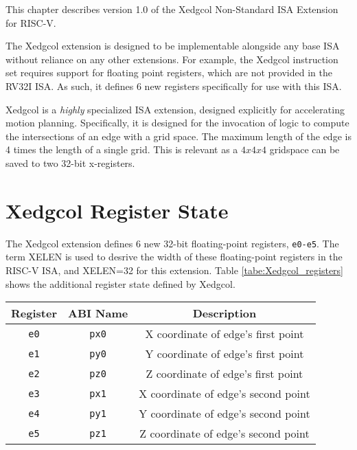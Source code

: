 
This chapter describes version 1.0 of the Xedgcol Non-Standard ISA Extension for RISC-V.

The Xedgcol extension is designed to be implementable alongside any base ISA without reliance on any other extensions. For example, the Xedgcol instruction set requires support for floating point registers, which are not provided in the RV32I ISA. As such, it defines 6 new registers specifically for use with this ISA.

Xedgcol is a \textit{highly} specialized ISA extension, designed explicitly for accelerating motion planning.
Specifically, it is designed for the invocation of logic to compute the intersections of an edge with a grid space. The maximum length of the edge is 4 times the length of a single grid. This is relevant as a $4x4x4$ gridspace can be saved to two 32-bit x-registers.

\section{Xedgcol Register State}
The Xedgcol extension defines 6 new 32-bit floating-point registers, \texttt{e0-e5}. The term XELEN is used to desrive the width of these floating-point registers in the RISC-V ISA, and XELEN=32 for this extension.
Table \ref{tabe:Xedgcol_registers} shows the additional register state defined by Xedgcol. 
\begin{table}[H]
\begin{centering}
\begin{tabular}{|c|c|c|}
\hline
\textbf{Register} & \textbf{ABI Name} & \textbf{Description} \\
\hline
\texttt{e0}     & \texttt{px0}      & X coordinate of edge's first point \\
\hline
\texttt{e1}     & \texttt{py0}      & Y coordinate of edge's first point \\
\hline
\texttt{e2}     & \texttt{pz0}      & Z coordinate of edge's first point \\
\hline
\texttt{e3}     & \texttt{px1}      & X coordinate of edge's second point \\
\hline
\texttt{e4}     & \texttt{py1}      & Y coordinate of edge's second point \\
\hline
\texttt{e5}     & \texttt{pz1}      & Z coordinate of edge's second point \\
\hline
\end{tabular}
\end{centering}
\end{table}

